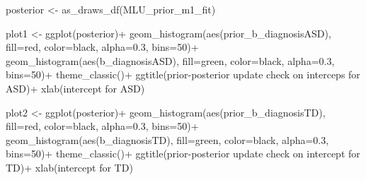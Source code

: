 \documentclass[
]{article}
\newenvironment{Shaded}{\begin{snugshade}}{\end{snugshade}}
\newcommand{\AttributeTok}[1]{\textcolor[rgb]{0.77,0.63,0.00}{#1}}
\newcommand{\DecValTok}[1]{\textcolor[rgb]{0.00,0.00,0.81}{#1}}
\newcommand{\FloatTok}[1]{\textcolor[rgb]{0.00,0.00,0.81}{#1}}
\newcommand{\FunctionTok}[1]{\textcolor[rgb]{0.00,0.00,0.00}{#1}}
\newcommand{\NormalTok}[1]{#1}
\newcommand{\OtherTok}[1]{\textcolor[rgb]{0.56,0.35,0.01}{#1}}
\newcommand{\SpecialCharTok}[1]{\textcolor[rgb]{0.00,0.00,0.00}{#1}}
\newcommand{\StringTok}[1]{\textcolor[rgb]{0.31,0.60,0.02}{#1}}
\begin{document}
\begin{Shaded}
\begin{Highlighting}[]
\NormalTok{posterior }\OtherTok{\textless{}{-}} \FunctionTok{as\_draws\_df}\NormalTok{(MLU\_prior\_m1\_fit)}

\NormalTok{plot1 }\OtherTok{\textless{}{-}} \FunctionTok{ggplot}\NormalTok{(posterior)}\SpecialCharTok{+}
  \FunctionTok{geom\_histogram}\NormalTok{(}\FunctionTok{aes}\NormalTok{(prior\_b\_diagnosisASD), }\AttributeTok{fill=}\StringTok{\textquotesingle{}red\textquotesingle{}}\NormalTok{, }\AttributeTok{color=}\StringTok{\textquotesingle{}black\textquotesingle{}}\NormalTok{, }\AttributeTok{alpha=}\FloatTok{0.3}\NormalTok{, }\AttributeTok{bins=}\DecValTok{50}\NormalTok{)}\SpecialCharTok{+}
  \FunctionTok{geom\_histogram}\NormalTok{(}\FunctionTok{aes}\NormalTok{(b\_diagnosisASD), }\AttributeTok{fill=}\StringTok{\textquotesingle{}green\textquotesingle{}}\NormalTok{, }\AttributeTok{color=}\StringTok{\textquotesingle{}black\textquotesingle{}}\NormalTok{, }\AttributeTok{alpha=}\FloatTok{0.3}\NormalTok{, }\AttributeTok{bins=}\DecValTok{50}\NormalTok{)}\SpecialCharTok{+}
  \FunctionTok{theme\_classic}\NormalTok{()}\SpecialCharTok{+}
  \FunctionTok{ggtitle}\NormalTok{(}\StringTok{\textquotesingle{}prior{-}posterior update check on interceps for ASD\textquotesingle{}}\NormalTok{)}\SpecialCharTok{+}
  \FunctionTok{xlab}\NormalTok{(}\StringTok{\textquotesingle{}intercept for ASD\textquotesingle{}}\NormalTok{)}

\NormalTok{plot2 }\OtherTok{\textless{}{-}} \FunctionTok{ggplot}\NormalTok{(posterior)}\SpecialCharTok{+}
  \FunctionTok{geom\_histogram}\NormalTok{(}\FunctionTok{aes}\NormalTok{(prior\_b\_diagnosisTD), }\AttributeTok{fill=}\StringTok{\textquotesingle{}red\textquotesingle{}}\NormalTok{, }\AttributeTok{color=}\StringTok{\textquotesingle{}black\textquotesingle{}}\NormalTok{, }\AttributeTok{alpha=}\FloatTok{0.3}\NormalTok{, }\AttributeTok{bins=}\DecValTok{50}\NormalTok{)}\SpecialCharTok{+}
  \FunctionTok{geom\_histogram}\NormalTok{(}\FunctionTok{aes}\NormalTok{(b\_diagnosisTD), }\AttributeTok{fill=}\StringTok{\textquotesingle{}green\textquotesingle{}}\NormalTok{, }\AttributeTok{color=}\StringTok{\textquotesingle{}black\textquotesingle{}}\NormalTok{, }\AttributeTok{alpha=}\FloatTok{0.3}\NormalTok{, }\AttributeTok{bins=}\DecValTok{50}\NormalTok{)}\SpecialCharTok{+}
  \FunctionTok{theme\_classic}\NormalTok{()}\SpecialCharTok{+}
  \FunctionTok{ggtitle}\NormalTok{(}\StringTok{\textquotesingle{}prior{-}posterior update check on intercept for TD\textquotesingle{}}\NormalTok{)}\SpecialCharTok{+}
  \FunctionTok{xlab}\NormalTok{(}\StringTok{\textquotesingle{}intercept for TD\textquotesingle{}}\NormalTok{)}


\end{Highlighting}
\end{Shaded}
\end{document}
